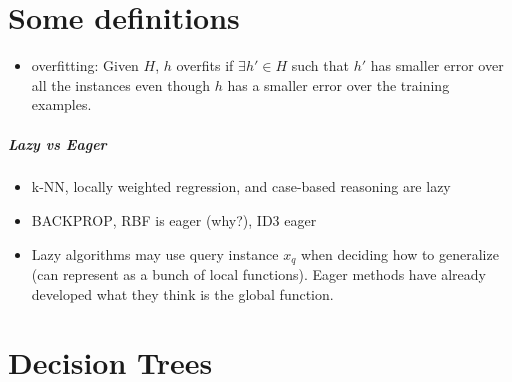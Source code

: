 \documentclass[11pt]{article}
\begin{document}
\medskip                        %

\section{Some definitions}
\begin{itemize}
\item overfitting: Given $H$, $h$ overfits if $\exists h' \in H$ such that $h'$ has smaller error over all the instances even though $h$ has a smaller error over the training examples.
\end{itemize}

\subparagraph{Lazy vs Eager}
\begin{itemize}
\item k-NN, locally weighted regression, and case-based reasoning are lazy
\item \textsc{BACKPROP}, RBF is eager (why?), ID3 eager
\item Lazy algorithms may use query instance $x_q$ when deciding how to generalize (can represent as a bunch of local functions). Eager methods have already developed what they think is the global function.
\end{itemize}

\section{Decision Trees}
\end{document}
